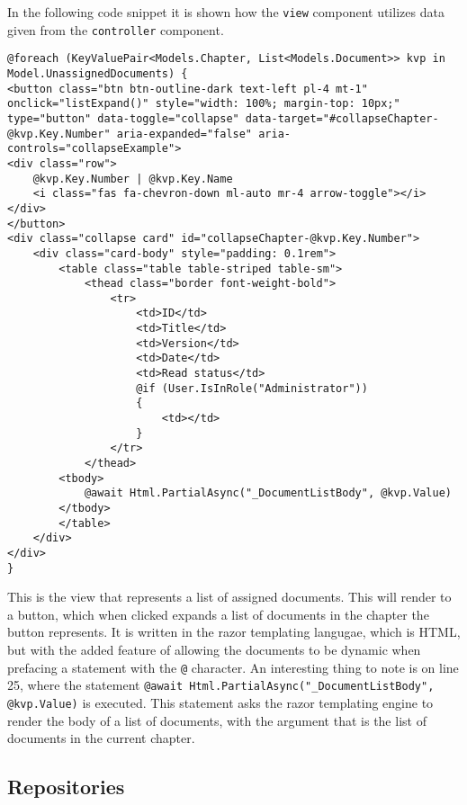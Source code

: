 In the following code snippet it is shown how the \texttt{view} component utilizes data given from the \texttt{controller} component.
\\
\begin{lstlisting}[caption={Document View: Index}, label={lst:docview}]
@foreach (KeyValuePair<Models.Chapter, List<Models.Document>> kvp in Model.UnassignedDocuments) {
<button class="btn btn-outline-dark text-left pl-4 mt-1" onclick="listExpand()" style="width: 100%; margin-top: 10px;" type="button" data-toggle="collapse" data-target="#collapseChapter-@kvp.Key.Number" aria-expanded="false" aria-controls="collapseExample">
<div class="row">
	@kvp.Key.Number | @kvp.Key.Name
	<i class="fas fa-chevron-down ml-auto mr-4 arrow-toggle"></i>
</div>
</button>
<div class="collapse card" id="collapseChapter-@kvp.Key.Number">
	<div class="card-body" style="padding: 0.1rem">
		<table class="table table-striped table-sm">
			<thead class="border font-weight-bold">
				<tr>
					<td>ID</td>
					<td>Title</td>
					<td>Version</td>
					<td>Date</td>
					<td>Read status</td>
					@if (User.IsInRole("Administrator"))
					{
						<td></td>
					}
				</tr>
			</thead>
		<tbody>
			@await Html.PartialAsync("_DocumentListBody", @kvp.Value)
		</tbody>
		</table>
	</div>
</div>
}

\end{lstlisting}

This is the view that represents a list of assigned documents.
This will render to a button, which when clicked expands a list of documents in the chapter the button represents.
It is written in the razor templating langugae, which is HTML, but with the added feature of allowing the documents to be dynamic when prefacing a statement with the \texttt{@} character.
An interesting thing to note is on line 25, where the statement \texttt{@await Html.PartialAsync("_DocumentListBody", @kvp.Value)} is executed.
This statement asks the razor templating engine to render the body of a list of documents, with the argument that is the list of documents in the current chapter.

\subsection{Repositories}

